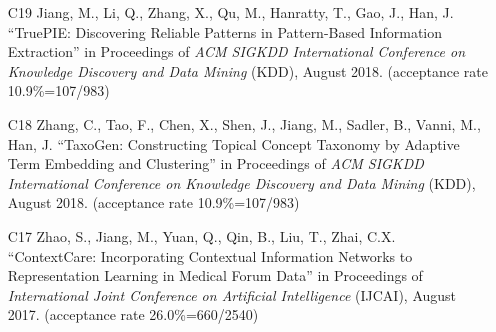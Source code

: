 \documentclass[10pt]{article}
\newenvironment{myindentpar}[1]%
{\begin{list}{}%
         {\setlength{\leftmargin}{#1}}%
         \item[]%
}
{\end{list}}
\newcounter{list}
\begin{document}
\begin{myindentpar}{0.00cm}
\begin{enumerate}[leftmargin=.5cm]
\vspace{-0.1cm}

\item[C19] Jiang, M., Li, Q., Zhang, X., Qu, M., Hanratty, T., Gao, J., Han, J. ``TruePIE: Discovering Reliable Patterns in Pattern-Based Information Extraction'' in Proceedings of \emph{ACM SIGKDD International Conference on Knowledge Discovery and Data Mining} (KDD), August 2018. (acceptance rate 10.9\%=107/983)

\vspace{-0.1cm}

\item[C18] Zhang, C., Tao, F., Chen, X., Shen, J., Jiang, M., Sadler, B., Vanni, M., Han, J. ``TaxoGen: Constructing Topical Concept Taxonomy by Adaptive Term Embedding and Clustering'' in Proceedings of \emph{ACM SIGKDD International Conference on Knowledge Discovery and Data Mining} (KDD), August 2018. (acceptance rate 10.9\%=107/983)

\vspace{-0.1cm}

\item[C17] Zhao, S., Jiang, M., Yuan, Q., Qin, B., Liu, T., Zhai, C.X. ``ContextCare: Incorporating Contextual Information Networks to Representation Learning in Medical Forum Data'' in Proceedings of \emph{International Joint Conference on Artificial Intelligence} (IJCAI), August 2017. (acceptance rate 26.0\%=660/2540)

\vspace{-0.1cm}


\end{enumerate}
\end{myindentpar}
\end{document}
